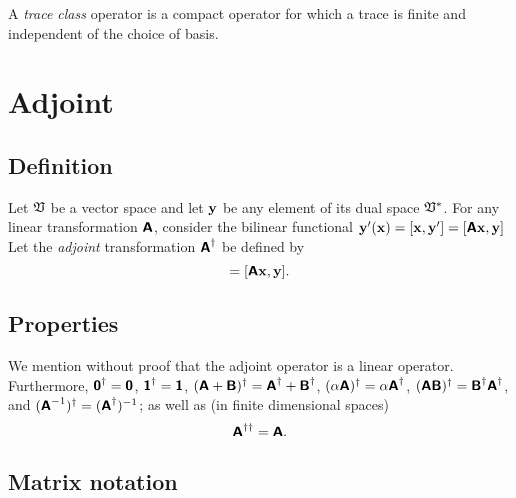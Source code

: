 A {\em trace class} operator is a compact operator for which a trace is finite and independent of the choice of basis.

\section{Adjoint}

\subsection{Definition}

Let ${\frak V}$ be a vector space and let ${\bf y}$
be any element of its dual space ${\frak V}^*$.
For any linear transformation $\textsf{\textbf{A}}$, consider
the bilinear functional
${\bf y}' ({\bf x}) =[{\bf x} ,{\bf y}'] =[\textsf{\textbf{A}}{\bf x},{\bf y}]$
Let the {\em adjoint} transformation $\textsf{\textbf{A}}^\dagger$ be defined by
\begin{equation}
[{\bf x},\textsf{\textbf{A}}^\dagger{\bf y}]=
[\textsf{\textbf{A}}{\bf x},{\bf y}].
\end{equation}


\subsection{Properties}
We mention without proof that the adjoint operator is a linear operator.
Furthermore,
$\textsf{\textbf{0}}^\dagger = \textsf{\textbf{0}}$,
$\textsf{\textbf{1}}^\dagger = \textsf{\textbf{1}}$,
$(\textsf{\textbf{A}}+\textsf{\textbf{B}})^\dagger = \textsf{\textbf{A}}^\dagger+\textsf{\textbf{B}}^\dagger$,
$(\alpha \textsf{\textbf{A}})^\dagger = \alpha \textsf{\textbf{A}}^\dagger$,
$( \textsf{\textbf{A}}\textsf{\textbf{B}})^\dagger =   \textsf{\textbf{B}}^\dagger
 \textsf{\textbf{A}}^\dagger$,
and
$( \textsf{\textbf{A}}^{-1})^\dagger
=
( \textsf{\textbf{A}}^\dagger )^{-1}
$;
as well as  (in finite dimensional spaces)
\begin{equation}
\textsf{\textbf{A}}^{\dagger \dagger}=
\textsf{\textbf{A}}.
\end{equation}

\subsection{Matrix notation}

